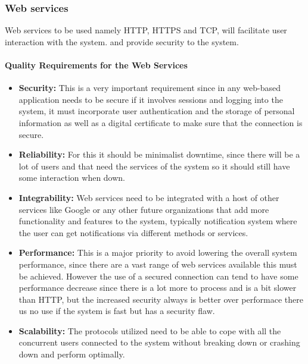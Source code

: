 \documentclass[a4paper]{article}
\begin{document}
  \subsubsection{Web services}
  Web services to be used namely HTTP, HTTPS and TCP, will facilitate user interaction with the system. and provide security to the system. 
  \paragraph{Quality Requirements for the Web Services}
  \begin{itemize}
  	\item{\textbf{Security:} This is a very important requirement since in any web-based application needs to be secure if it involves sessions and logging into the system, it must incorporate user authentication and the storage of personal information as well as a digital certificate to make sure that the connection is secure.}
  	\item{\textbf{Reliability:} For this it should be minimalist downtime, since there will be a lot of users and that need the services of the system so it should still have some interaction when down. }
  	\item{\textbf{Integrability:} Web services need to be integrated with a host of other services like Google or any other future organizations that add more functionality and features to the system, typically notification system where the user can get notifications via different methods or services.}
  	\item{\textbf{Performance:} This is a major priority to avoid lowering the overall system performance, since there are a vast range of web services available this must be achieved. However the use of a secured connection can tend to have some performance decrease since there is a lot more to process and is a bit slower than HTTP, but the increased security always is better over performace there us no use if the system is fast but has a security flaw.}
  	\item{\textbf{Scalability:} The protocols utilized need to be able to cope with all the concurrent users connected to the system without breaking down or crashing down and perform optimally.}
  \end{itemize}
  
\end{document}
